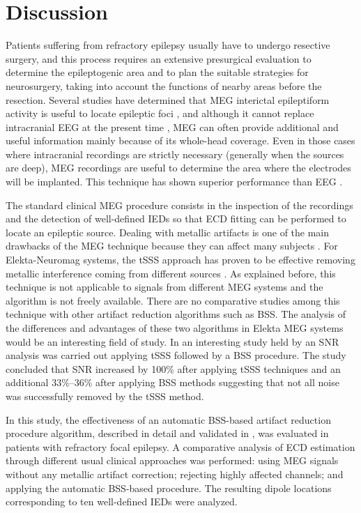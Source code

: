 \section{Discussion}

Patients suffering from refractory epilepsy usually have to undergo resective surgery, and this process requires an extensive presurgical evaluation to determine the epileptogenic area and to plan the suitable strategies for neurosurgery, taking into account the functions of nearby areas before the resection. Several studies have determined that MEG interictal epileptiform activity is useful to locate epileptic foci \citep{Shibasaki2007,Enatsu2008,Englot2015}, and although it cannot replace intracranial EEG at the present time \citep{Shibasaki2007}, MEG can often provide additional and useful information mainly because of its whole-head coverage. Even in those cases where intracranial recordings are strictly necessary (generally when the sources are deep), MEG recordings are useful to determine the area where the electrodes will be implanted. This technique has shown superior performance than EEG \citep{Amo2003,Stefan2004,Ramantani2006}.

The standard clinical MEG procedure consists in the inspection of the recordings and the detection of well-defined IEDs so that ECD fitting can be performed to locate an epileptic source. Dealing with metallic artifacts is one of the main drawbacks of the MEG technique because they can affect many subjects \citep{Vrba2002}. For Elekta-Neuromag systems, the tSSS approach has proven to be effective removing metallic interference coming from different sources \citep{Song2009,Kakisaka2012,Jin2013,Wang2013}. As explained before, this technique is not applicable to signals from different MEG systems and the algorithm is not freely available. There are no comparative studies among this technique with other artifact reduction algorithms such as BSS. The analysis of the differences and advantages of these two algorithms in Elekta MEG systems would be an interesting field of study. In an interesting study held by \citep{GonzalezMoreno2014} an SNR analysis was carried out applying tSSS followed by a BSS procedure. The study concluded that SNR increased by 100\% after applying tSSS techniques and an additional 33\%–36\% after applying BSS methods suggesting that not all noise was successfully removed by the tSSS method.

In this study, the effectiveness of an automatic BSS-based artifact reduction procedure algorithm, described in detail and validated in \citep{Migliorelli2015}, was evaluated in patients with refractory focal epilepsy. A comparative analysis of ECD estimation through different usual clinical approaches was performed: using MEG signals without any metallic artifact correction; rejecting highly affected channels; and applying the automatic BSS-based procedure. The resulting dipole locations corresponding to ten well-defined IEDs were analyzed.

